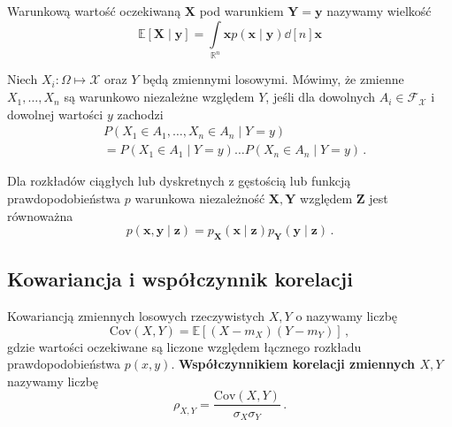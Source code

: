 \documentclass{myclass}
\numberwithin{equation}{subsection}
\begin{document}
\begin{definition}
Warunkową wartość oczekiwaną \(\mathbf{X}\) pod warunkiem \(\mathbf{Y} = \mathbf{y}\) nazywamy
wielkość
\begin{equation*}
    \mathbb{E}[\mathbf{X} \mid \mathbf{y}] = \int\limits_{\mathbb{R}^n} \mathbf{x} p(\mathbf{x} \mid \mathbf{y}) \dd[n]{\mathbf{x}}
\end{equation*}
\end{definition}

\begin{definition}
Niech \(X_i : \Omega \mapsto \mathcal{X}\) oraz \(Y\) będą zmiennymi losowymi. Mówimy, że zmienne
\(X_1,\ldots,X_n\) są warunkowo niezależne względem \(Y\), jeśli dla dowolnych \(A_i \in
\mathcal{F}_\mathcal{X}\) i dowolnej wartości \(y\) zachodzi
\begin{equation*}
    \begin{split}
        &P(X_1\in A_1,\ldots,X_n\in A_n \mid Y = y) \\
        &= P(X_1 \in A_1 \mid Y = y)\ldots P(X_n \in A_n \mid Y = y)\,.
    \end{split}
\end{equation*}  
\end{definition}

Dla rozkładów ciągłych lub dyskretnych z gęstością lub funkcją prawdopodobieństwa \(p\) warunkowa
niezależność \(\mathbf{X}, \mathbf{Y}\) względem \(\mathbf{Z}\) jest równoważna
\begin{equation*}
    p(\mathbf{x},\mathbf{y} \mid \mathbf{z}) = p_\mathbf{X}(\mathbf{x} \mid \mathbf{z})p_\mathbf{Y}(\mathbf{y} \mid \mathbf{z})\,.
\end{equation*}


\subsection{Kowariancja i współczynnik korelacji}

\begin{definition}[Kowariancji]
Kowariancją zmiennych losowych rzeczywistych \(X, Y\) o nazywamy liczbę
\begin{equation*}
    \mathrm{Cov}(X, Y) = \mathbb{E}[(X - m_X)(Y - m_Y)]\,,
\end{equation*}
gdzie wartości oczekiwane są liczone względem łącznego rozkładu prawdopodobieństwa \(p(x,y)\).
\textbf{Współczynnikiem korelacji zmiennych \(X, Y\)} nazywamy liczbę
\begin{equation*}
    \rho_{X,Y} = \frac{\mathrm{Cov}(X, Y)}{\sigma_X \sigma_Y}\,.
\end{equation*}
\end{definition}
\end{document}
